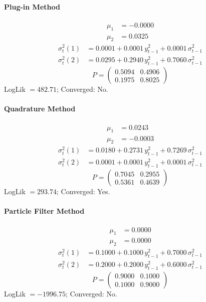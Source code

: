 \documentclass[11pt, a4paper]{article}
\begin{document}
\paragraph{Plug-in Method}
\begin{align}
\mu_{1} &= -0.0000 \\
\mu_{2} &= 0.0325
\end{align}
\begin{align}
\sigma^2_{t}(1) &= 0.0001 + 0.0001\, y_{t-1}^2 + 0.0001\, \sigma^2_{t-1} \\
\sigma^2_{t}(2) &= 0.0295 + 0.2940\, y_{t-1}^2 + 0.7060\, \sigma^2_{t-1}
\end{align}
\begin{equation}
P = \begin{pmatrix} 0.5094 & 0.4906 \\ 0.1975 & 0.8025 \end{pmatrix}
\end{equation}
LogLik $= 482.71$; Converged: No.

\paragraph{Quadrature Method}
\begin{align}
\mu_{1} &= 0.0243 \\
\mu_{2} &= -0.0003
\end{align}
\begin{align}
\sigma^2_{t}(1) &= 0.0180 + 0.2731\, y_{t-1}^2 + 0.7269\, \sigma^2_{t-1} \\
\sigma^2_{t}(2) &= 0.0001 + 0.0001\, y_{t-1}^2 + 0.0001\, \sigma^2_{t-1}
\end{align}
\begin{equation}
P = \begin{pmatrix} 0.7045 & 0.2955 \\ 0.5361 & 0.4639 \end{pmatrix}
\end{equation}
LogLik $= 293.74$; Converged: Yes.

\paragraph{Particle Filter Method}
\begin{align}
\mu_{1} &= 0.0000 \\
\mu_{2} &= 0.0000
\end{align}
\begin{align}
\sigma^2_{t}(1) &= 0.1000 + 0.1000\, y_{t-1}^2 + 0.7000\, \sigma^2_{t-1} \\
\sigma^2_{t}(2) &= 0.2000 + 0.2000\, y_{t-1}^2 + 0.6000\, \sigma^2_{t-1}
\end{align}
\begin{equation}
P = \begin{pmatrix} 0.9000 & 0.1000 \\ 0.1000 & 0.9000 \end{pmatrix}
\end{equation}
LogLik $= -1996.75$; Converged: No.
\end{document}
